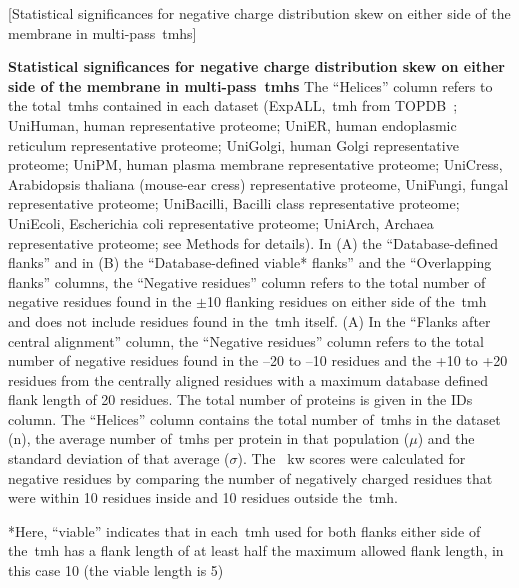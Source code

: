 \begin{table}[htbp]
  \centering
  [Statistical significances for negative charge distribution skew on either side of the membrane in multi-pass~\gls{tmh}s]{\textbf{Statistical significances for negative charge distribution skew on either side of the membrane in multi-pass~\gls{tmh}s}
The ``Helices'' column refers to the total~\gls{tmh}s contained in each dataset (ExpALL,~\gls{tmh} from TOPDB~\cite{Dobson2015}; UniHuman, human representative proteome; UniER, human endoplasmic reticulum representative proteome; UniGolgi, human Golgi representative proteome; UniPM, human plasma membrane representative proteome; UniCress, Arabidopsis thaliana (mouse-ear cress) representative proteome, UniFungi, fungal representative proteome; UniBacilli, Bacilli class representative proteome; UniEcoli, Escherichia coli representative proteome; UniArch, Archaea representative proteome; see Methods for details).
In (A) the ``Database-defined flanks'' and in (B) the ``Database-defined viable* flanks'' and the ``Overlapping flanks'' columns, the ``Negative residues'' column refers to the total number of negative residues found in the $\pm$10 flanking residues on either side of the~\gls{tmh} and does not include residues found in the~\gls{tmh} itself.
(A) In the ``Flanks after central alignment'' column, the ``Negative residues'' column refers to the total number of negative residues found in the –20 to –10 residues and the +10 to +20 residues from the centrally aligned residues with a maximum database defined flank length of 20 residues.
The total number of proteins is given in the IDs column.
The ``Helices'' column contains the total number of~\gls{tmh}s in the dataset (n), the average number of~\gls{tmh}s per protein in that population ($\mu$) and the standard deviation of that average ($\sigma$).
The ~\gls{kw} scores were calculated for negative residues by comparing the number of negatively charged residues that were within 10 residues inside and 10 residues outside the~\gls{tmh}.

*Here, ``viable'' indicates that in each~\gls{tmh} used for both flanks either side of the~\gls{tmh} has a flank length of at least half the maximum allowed flank length, in this case 10 (the viable length is 5)}


\end{table}
